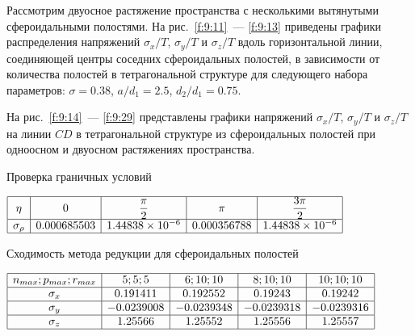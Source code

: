 Рассмотрим двуосное растяжение пространства с несколькими вытянутыми сфероидальными полостями. На рис.~\ref{f:9:11}~--- \ref{f:9:13} приведены графики распределения напряжений $\sigma_x/T$, $\sigma_y/T$ и $\sigma_z/T$ вдоль горизонтальной  линии, соединяющей центры соседних сфероидальных полостей, в зависимости от количества полостей в тетрагональной структуре для следующего набора параметров: $\sigma=0.38$, $a/d_1=2.5$, $d_2/d_1=0.75$.

На рис.~\ref{f:9:14}~--- \ref{f:9:29} представлены графики напряжений $\sigma_x/T$, $\sigma_y/T$ и $\sigma_z/T$ на линии $CD$ в тетрагональной структуре из сфероидальных полостей при одноосном и двуосном растяжениях пространства.

%

\begin{table}[h]
\caption{Проверка граничных условий}
\centering
$
\begin{array}{|c|c|c|c|c|}
\hline
\eta & 0 & \dfrac{\pi}{2} & \pi & \dfrac{3\pi}{2} \\
\hline
\sigma_\rho & 0.000685503 & 1.44838\times 10^{-6} & 0.000356788 & 1.44838\times 10^{-6} \\
\hline
\end{array}
$
\label{t:9:1}
\end{table}

\begin{table}[h]
\caption{Сходимость метода редукции для сфероидальных полостей}
\centering
$
\begin{array}{|c|c|c|c|c|}
\hline
n_{max}; p_{max}; r_{max} & 5; 5; 5 & 6; 10; 10 & 8; 10; 10 & 10; 10; 10 \\
\hline
\sigma_x & 0.191411		& 0.192552 	& 0.19243 		& 0.19242 \\
\hline
\sigma_y & -0.0239008 	& -0.0239348 	& -0.0239318 	& -0.0239316 \\
\hline
\sigma_z & 1.25566 		& 1.25552 		& 1.25556 		& 1.25557 \\
\hline
\end{array}
$
\label{t:9:2}
\end{table}

